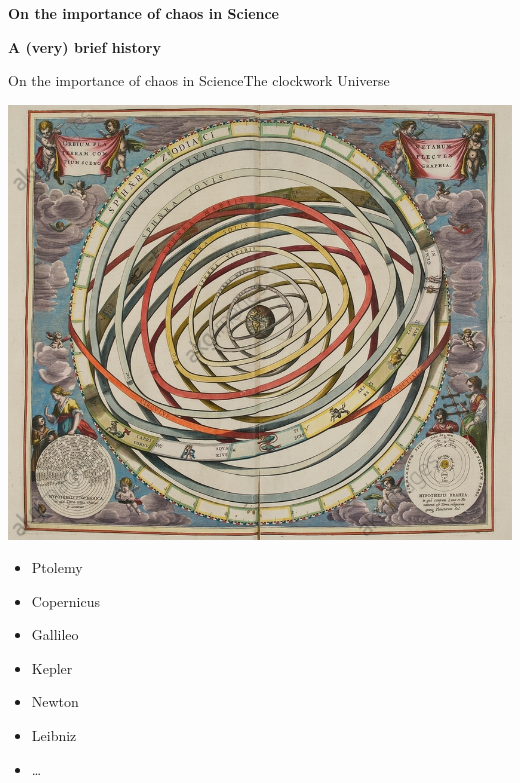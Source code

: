 \documentclass[usenames, dvipsnames, aspectratio=169]{beamer}
\begin{document}
{



  \begin{frame}
    \vfill
    \Large
    \centering

    \textbf{On the importance of chaos in Science}

    \bigskip

    \large
    \textbf{\color{gray} A (very) brief history}

    \vfill
  \end{frame}

}

\begin{frame}[t, c]{On the importance of chaos in Science}{The clockwork Universe}

  \hfill
  \begin{minipage}{.48\textwidth}
    \centering
    \includegraphics[width=\textwidth]{clockwork}
  \end{minipage}%
  \hfill
  \begin{minipage}{.28\textwidth}
    \centering
    \begin{itemize}
    \item Ptolemy
    \item Copernicus
    \item Gallileo
    \item Kepler
    \item Newton
    \item Leibniz
    \item \ldots
    \end{itemize}
  \end{minipage}
\end{frame}
\end{document}
